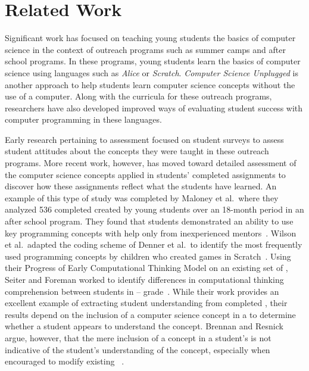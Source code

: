 \section{Related Work}
Significant work has focused on teaching young students the basics of computer
science in the context of outreach programs such as summer camps and after
school programs. In these programs, young students learn the basics of computer
science using languages such as \emph{Alice} or \emph{Scratch}. \emph{Computer
  Science Unplugged} is another approach to help students learn computer
science concepts without the use of a computer. Along with the curricula for
these outreach programs, researchers have also developed improved ways of
evaluating student success with computer programming in these languages.

Early research pertaining to assessment focused on student surveys to assess
student attitudes about the concepts they were taught in these outreach
programs. More recent work, however, has moved toward detailed assessment of
the computer science concepts applied in students' completed assignments to
discover how these assignments reflect what the students have learned. An
example of this type of study was completed by Maloney et al.\, where they
analyzed 536 completed  created by young students over an 18-month
period in an after school program. They found that students demonstrated an
ability to use key programming concepts with help only from inexperienced
mentors~\cite{Maloney:2008:PCU:1352135.1352260}. Wilson et al.\ adapted the
coding scheme of Denner et al.\ to identify the most frequently used
programming concepts by children who created games in
Scratch~\cite{Denner:2012:CGC:2072695.2073050, wilson12}. Using their Progress
of Early Computational Thinking Model on an existing set of ,
Seiter and Foreman worked to identify differences in computational thinking
comprehension between students in --
grade~\cite{Seiter:2013:MLP:2493394.2493403}. While their work provides an
excellent example of extracting student understanding from completed
, their results depend on the inclusion of a computer science
concept in a \sprogram{} to determine whether a student appears to understand
the concept. Brennan and Resnick argue, however, that the mere inclusion of a
concept in a student's \sprogram{} is not indicative of the student's
understanding of the concept, especially when encouraged to modify existing
~\cite{brennan12}.

